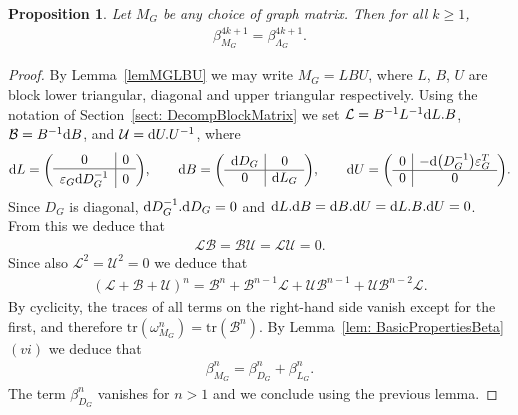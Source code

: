 \documentclass[pdftex]{sigma}%
\newtheorem{prop}[thm]{Proposition}
\numberwithin{equation}{section}
\newcommand{\tr}{\mathrm{tr}}
\newcommand{\0}{\color{blue}{\mathsf{0}}}
\begin{document}
\begin{prop} Let $M_G$ be any choice of graph matrix. Then for all $k\geq 1$,
\begin{gather*}
 \beta^{4k+1}_{M_G} = \beta^{4k+1}_{\Lambda_G} .
 \end{gather*}
\end{prop}
\begin{proof}
By Lemma~\ref{lemMGLBU} we may write $M_G= L B U $,
where $L$, $B$, $U$ are block lower triangular, diagonal and upper triangular respectively.
Using the notation of Section~\ref{sect: DecompBlockMatrix} we set $\mathcal{L} = B^{-1} L^{-1} {\rm d}L. B$, $\mathcal{B} = B^{-1} {\rm d}B$, and
$\mathcal{U} = {\rm d}U . U^{-1}$, where
\begin{gather*}
{\rm d} L= \left(\begin{array}{c|c}
 0 & 0 \\ \hline
 \varepsilon_G {\rm d} D_G^{-1^{\vphantom{1}}} & 0 \\
\end{array}\right)\!, \qquad
{\rm d} B = \left(\begin{array}{c|c}
 {\rm d} D_G & 0 \\ \hline
 0 & {\rm d} L_G \\
\end{array}\right) \!, \qquad
{\rm d} U = \left(\begin{array}{c|c}
 0 & - {\rm d} \big(D^{-1}_G\big) \varepsilon^T_G \\ \hline
 0 & 0 \\
\end{array}\right)\!.
\end{gather*}
 Since $D_G$ is diagonal, ${\rm d}D^{-1}_G . {\rm d}D_G=0$ and
${\rm d}L. {\rm d}B = {\rm d}B. {\rm d}U = {\rm d}L . B. {\rm d}U = 0$. From this we deduce that
\begin{gather*}
 \mathcal{L} \mathcal{B} = \mathcal{B} \mathcal{U} = \mathcal{L} \mathcal{U}=0.
 \end{gather*}
Since also $\mathcal{L}^2= \mathcal{U}^2 =0$ we deduce that
\begin{gather*}
 \left( \mathcal{L} + \mathcal{B} + \mathcal{U}\right)^n = \mathcal{B}^n + \mathcal{B}^{n-1} \mathcal{L} + \mathcal{U} \mathcal{B}^{n-1} + \mathcal{U} \mathcal{B}^{n-2} \mathcal{L}.
 \end{gather*}
By cyclicity, the traces of all terms on the right-hand side vanish except for the first, and therefore
$ \tr (\omega_{M_G}^n) = \tr ( \mathcal{B}^n)$.
By Lemma~\ref{lem: BasicPropertiesBeta}$(vi)$ we deduce that
\begin{gather*} %
\beta^n_{M_G} = \beta^n_{D_G} + \beta_{L_G}^n .
\end{gather*}
The term $ \beta^n_{D_G}$ vanishes for $n>1$ and we conclude using the previous lemma.
\end{proof}
\end{document}
